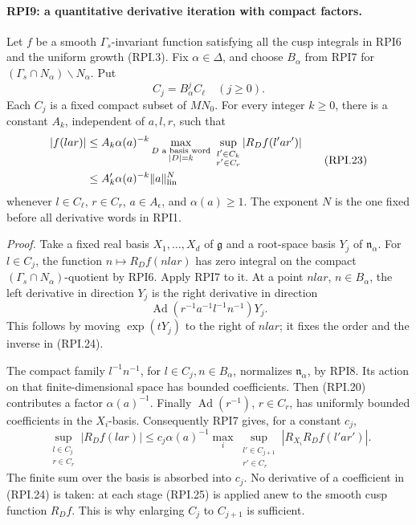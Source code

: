 \paragraph{RPI9: a quantitative derivative iteration with compact factors.}
\label{claim:RPI9}
Let \(f\) be a smooth \(\Gamma_s\)-invariant function satisfying
all the cusp integrals in RPI6 and the uniform growth (RPI.3).
Fix \(\alpha\in\Delta\), and choose \(B_\alpha\) from RPI7 for
\((\Gamma_s\cap N_\alpha)\backslash N_\alpha\).  Put
\[
       C_j=B_\alpha^jC_\ell\quad(j\ge0).
 \tag{RPI.22}
\]
Each \(C_j\) is a fixed compact subset of \(MN_0\).
For every integer \(k\ge0\), there is a constant \(A_k\),
independent of \(a,l,r\), such that
\[
 \begin{split}
 |f(l a r)|
  &\le A_k\alpha(a)^{-k}
       \max_{\substack{D\text{ a basis word}\\ |D|=k}}
       \ \sup_{\substack{l'\in C_k\\r'\in C_r}}
                             |R_Df(l'a r')|\\
  &\le A'_k\alpha(a)^{-k}\|a\|_{\rm lin}^{N}
 \end{split}
 \tag{RPI.23}
\]
whenever \(l\in C_\ell\), \(r\in C_r\),
\(a\in A_\epsilon\), and \(\alpha(a)\ge1\).
The exponent \(N\) is the one fixed before all derivative
words in RPI1.

\emph{Proof.}
Take a fixed real basis \(X_1,\ldots,X_d\) of
\(\mathfrak g\) and a root-space basis \(Y_j\) of
\(\mathfrak n_\alpha\).  For \(l\in C_j\), the function
\(n\mapsto R_Df(nlar)\) has zero integral on the compact
\((\Gamma_s\cap N_\alpha)\)-quotient by RPI6.
Apply RPI7 to it.  At a point \(nlar\), \(n\in B_\alpha\),
the left derivative in direction \(Y_j\) is the right
derivative in direction
\[
        \operatorname{Ad}(r^{-1}a^{-1}l^{-1}n^{-1})Y_j .
 \tag{RPI.24}
\]
This follows by moving \(\exp(tY_j)\) to the right of
\(nlar\); it fixes the order and the inverse in (RPI.24).

The compact family \(l^{-1}n^{-1}\), for
\(l\in C_j,n\in B_\alpha\), normalizes
\(\mathfrak n_\alpha\), by RPI8.  Its action on that
finite-dimensional space has bounded coefficients.
Then (RPI.20) contributes a factor \(\alpha(a)^{-1}\).
Finally \(\operatorname{Ad}(r^{-1})\), \(r\in C_r\),
has uniformly bounded coefficients in the \(X_i\)-basis.
Consequently RPI7 gives, for a constant \(c_j\),
\[
 \sup_{\substack{l\in C_j\\r\in C_r}}
                |R_Df(lar)|
 \le c_j\alpha(a)^{-1}
       \max_i\sup_{\substack{l'\in C_{j+1}\\r'\in C_r}}
                                  |R_{X_i}R_Df(l'ar')|.
 \tag{RPI.25}
\]
The finite sum over the basis is absorbed into \(c_j\).
No derivative of a coefficient in (RPI.24) is taken: at
each stage (RPI.25) is applied anew to the smooth cusp
function \(R_Df\).  This is why enlarging \(C_j\) to
\(C_{j+1}\) is sufficient.

